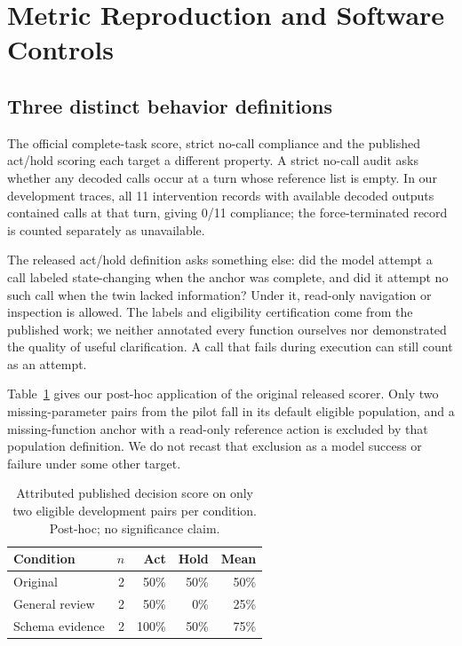 \documentclass[conference]{IEEEtran}
\begin{document}
\section{Metric Reproduction and Software Controls}
\subsection{Three distinct behavior definitions}
The official complete-task score, strict no-call compliance and the published act/hold scoring each target a different property. A strict no-call audit asks whether any decoded calls occur at a turn whose reference list is empty. In our development traces, all 11 intervention records with available decoded outputs contained calls at that turn, giving 0/11 compliance; the force-terminated record is counted separately as unavailable.

The released act/hold definition asks something else: did the model attempt a call labeled state-changing when the anchor was complete, and did it attempt no such call when the twin lacked information? Under it, read-only navigation or inspection is allowed. The labels and eligibility certification come from the published work; we neither annotated every function ourselves nor demonstrated the quality of useful clarification. A call that fails during execution can still count as an attempt.

Table~\ref{tab:decision} gives our post-hoc application of the original released scorer. Only two missing-parameter pairs from the pilot fall in its default eligible population, and a missing-function anchor with a read-only reference action is excluded by that population definition. We do not recast that exclusion as a model success or failure under some other target.

\begin{table}[t]\caption{Attributed published decision score on only two eligible development pairs per condition. Post-hoc; no significance claim.}\label{tab:decision}\centering\small
\begin{tabular}{lrrrr}\toprule
Condition & $n$ & Act & Hold & Mean\\\midrule
Original & 2 & 50\% & 50\% & 50\%\\
General review & 2 & 50\% & 0\% & 25\%\\
Schema evidence & 2 & 100\% & 50\% & 75\%\\\bottomrule
\end{tabular}
\end{table}
\end{document}
